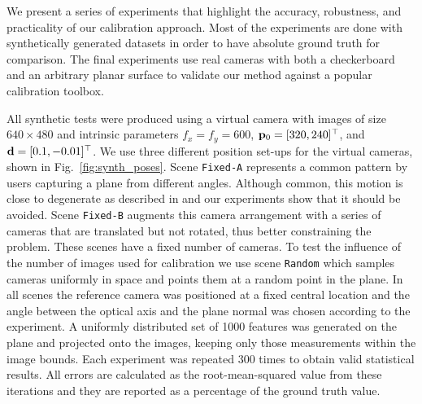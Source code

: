 \documentclass[10pt,twocolumn,letterpaper]{article}
\begin{document}
We present a series of experiments that highlight the accuracy, robustness, and practicality of our calibration approach. Most of the experiments are done with synthetically generated datasets in order to have absolute ground truth for comparison. The final experiments use real cameras with both a checkerboard and an arbitrary planar surface to validate our method against a popular calibration toolbox.

All synthetic tests were produced using a virtual camera with images of size $640 \times 480$ and intrinsic parameters $f_x=f_y=600$, $\mathbf{p}_0=[320,240]^\top$, and $\mathbf{d}=[0.1,-0.01]^\top$. We use three different position set-ups for the virtual cameras, shown in Fig.~\ref{fig:synth_poses}. Scene \texttt{Fixed-A} represents a common pattern by users capturing a plane from different angles. Although common, this motion is close to degenerate as described in \cite{sturm1997} and our experiments show that it should be avoided. Scene \texttt{Fixed-B} augments this camera arrangement with a series of cameras that are translated but not rotated, thus better constraining the problem. These scenes have a fixed number of cameras. To test the influence of the number of images used for calibration we use scene \texttt{Random} which samples cameras uniformly in space and points them at a random point in the plane. In all scenes the reference camera was positioned at a fixed central location and the angle between the optical axis and the plane normal was chosen according to the experiment. A uniformly distributed set of 1000 features was generated on the plane and projected onto the images, keeping only those measurements within the image bounds. Each experiment was repeated 300 times to obtain valid statistical results. All errors are calculated as the root-mean-squared value from these iterations and they are reported as a percentage of the ground truth value.
\end{document}
